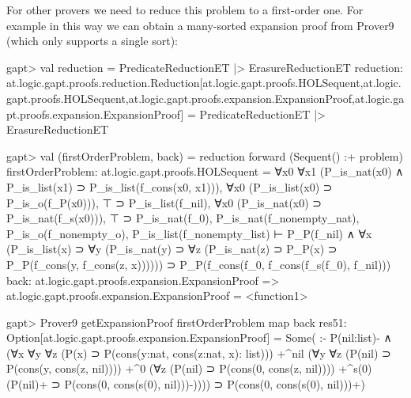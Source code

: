\documentclass[a4paper,11pt]{article}
\begin{document}
For other provers we need to reduce this problem to a first-order one.  For
example in this way we can obtain a many-sorted expansion proof from Prover9
(which only supports a single sort):
\begin{clilisting}
gapt> val reduction = PredicateReductionET |> ErasureReductionET
reduction: at.logic.gapt.proofs.reduction.Reduction[at.logic.gapt.proofs.HOLSequent,at.logic.gapt.proofs.HOLSequent,at.logic.gapt.proofs.expansion.ExpansionProof,at.logic.gapt.proofs.expansion.ExpansionProof] = PredicateReductionET |> ErasureReductionET

gapt> val (firstOrderProblem, back) = reduction forward (Sequent() :+ problem)
firstOrderProblem: at.logic.gapt.proofs.HOLSequent =
∀x0 ∀x1 (P_is_nat(x0) ∧ P_is_list(x1) ⊃ P_is_list(f_cons(x0, x1))),
∀x0 (P_is_list(x0) ⊃ P_is_o(f_P(x0))),
⊤ ⊃ P_is_list(f_nil),
∀x0 (P_is_nat(x0) ⊃ P_is_nat(f_s(x0))),
⊤ ⊃ P_is_nat(f_0),
P_is_nat(f_nonempty_nat),
P_is_o(f_nonempty_o),
P_is_list(f_nonempty_list)
⊢
P_P(f_nil) ∧
    ∀x (P_is_list(x) ⊃
        ∀y (P_is_nat(y) ⊃
            ∀z (P_is_nat(z) ⊃ P_P(x) ⊃ P_P(f_cons(y, f_cons(z, x)))))) ⊃
  P_P(f_cons(f_0, f_cons(f_s(f_0), f_nil)))
back: at.logic.gapt.proofs.expansion.ExpansionProof => at.logic.gapt.proofs.expansion.ExpansionProof = <function1>

gapt> Prover9 getExpansionProof firstOrderProblem map back
res51: Option[at.logic.gapt.proofs.expansion.ExpansionProof] =
Some(
:-
P(nil:list)- ∧
    (∀x ∀y ∀z (P(x) ⊃ P(cons(y:nat, cons(z:nat, x): list)))
      +^{nil}
        (∀y ∀z (P(nil) ⊃ P(cons(y, cons(z, nil))))
          +^{0}
            (∀z (P(nil) ⊃ P(cons(0, cons(z, nil))))
            +^{s(0)} (P(nil)+ ⊃ P(cons(0, cons(s(0), nil)))-)))) ⊃
  P(cons(0, cons(s(0), nil)))+)

\end{clilisting}
\end{document}
